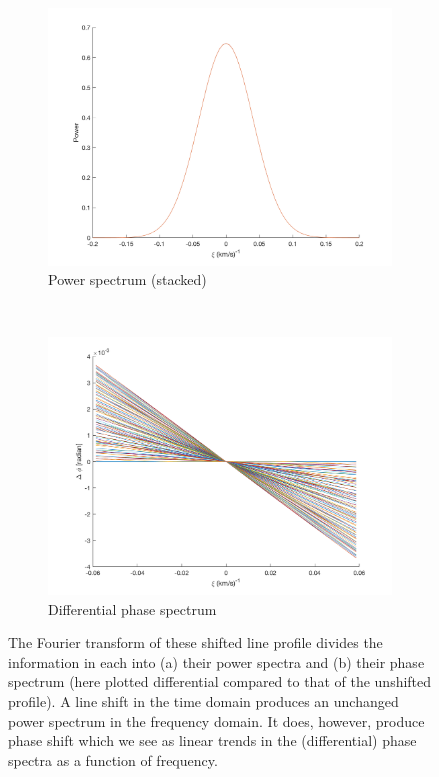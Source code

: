 \begin{figure}[tbp]	
    \begin{subfigure}[b]{0.49\textwidth}
        \includegraphics[width=\textwidth]{./Figures/Methods/2-FT_power.png}
        \caption{Power spectrum (stacked)}
        \label{fig:power_spectrum}
    \end{subfigure}
	~
    \begin{subfigure}[b]{0.49\textwidth}
        \includegraphics[width=\textwidth]{./Figures/Methods/4-Relative_phase_angle.png}
        \caption{Differential phase spectrum}
        \label{fig:dps}
    \end{subfigure}	
    
    \caption[Fourier transform of 100 shifted line profiles]{The Fourier transform of these shifted line profile divides the 
    information in each into (a) their power spectra and (b) their phase spectrum (here plotted differential compared to that of
    the unshifted profile). A line shift in the time domain produces an unchanged power spectrum in the frequency domain.
    It does, however, produce phase shift which we see as linear trends in the (differential) phase spectra as a function of frequency.}
\label{fig:FT_process}
\end{figure}    


